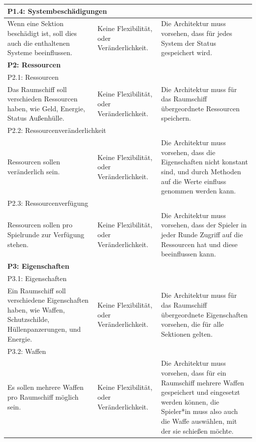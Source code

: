 \documentclass[fontsize=12pt,paper=a4,twoside]{scrartcl}
\begin{document}
\begin{longtable}[c]{|p{5cm}|p{5cm}|p{5cm}|}
\\ \hline
\multicolumn{3}{|l|}{{P1.4: Systembeschädigungen}} 
\\ \hline
Wenn eine Sektion beschädigt ist, soll dies auch die enthaltenen Systeme beeinflussen. & Keine Flexibilität, oder Veränderlichkeit.    & Die Architektur muss vorsehen, dass für jedes System der Status gespeichert wird. 
\\ \hline
%
\multicolumn{3}{|l|}{{\textbf{P2: Ressourcen}}} 
\\ \hline
\multicolumn{3}{|l|}{{P2.1: Ressourcen}} 
\\ \hline
Das Raumschiff soll verschieden Ressourcen haben, wie Geld, Energie, Status Außenhülle.  & Keine Flexibilität, oder Veränderlichkeit.    & Die Architektur muss für das Raumschiff übergeordnete Ressourcen speichern. 
\\ \hline                                                      
\multicolumn{3}{|l|}{{P2.2: Ressourcenveränderlichkeit}} 
\\ \hline
Ressourcen sollen veränderlich sein. & Keine Flexibilität, oder Veränderlichkeit.    & Die Architektur muss vorsehen, dass die Eigenschaften nicht konstant sind, und durch Methoden auf die Werte einfluss genommen werden kann. 
\\ \hline
\multicolumn{3}{|l|}{{P2.3: Ressourcenverfügung}} 
\\ \hline
Ressourcen sollen pro Spielrunde zur Verfügung stehen. & Keine Flexibilität, oder Veränderlichkeit.    & Die Architektur muss vorsehen, dass der Spieler in jeder Runde Zugriff auf die Ressourcen hat und diese beeinflussen kann. 
\\ \hline
%
\multicolumn{3}{|l|}{{\textbf{P3: Eigenschaften}}} 
\\ \hline
\multicolumn{3}{|l|}{{P3.1: Eigenschaften}} 
\\ \hline
Ein Raumschiff soll verschiedene Eigenschaften haben, wie Waffen, Schutzschilde, Hüllenpanzerungen, und Energie. & Keine Flexibilität, oder Veränderlichkeit.    &  Die Architektur muss für das Raumschiff übergeordnete Eigenschaften vorsehen, die für alle Sektionen gelten. 
\\ \hline
\multicolumn{3}{|l|}{{P3.2: Waffen}} 
\\ \hline
Es sollen mehrere Waffen pro Raumschiff möglich sein. & Keine Flexibilität, oder Veränderlichkeit.    & Die Architektur muss vorsehen, dass für ein Raumschiff mehrere Waffen gespeichert und eingesetzt werden können, die Spieler*in muss also auch die Waffe auswählen, mit der sie schießen möchte. 

\end{longtable}
\end{document}
